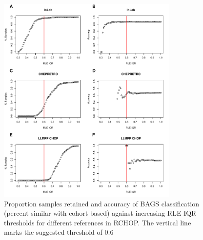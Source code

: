 \begin{figure}
	\begin{center}
		\includegraphics[width=0.8\textwidth]{figures/RCHOP_rle_classification_bags.pdf}
	\end{center}
	\caption{Proportion samples retained and accuracy of BAGS classification (percent similar with cohort based) against increasing RLE IQR thresholds for different references in RCHOP. The vertical line marks the suggested threshold of 0.6}
	\label{fig:RCHOP_rle_clas_bags}
\end{figure}

